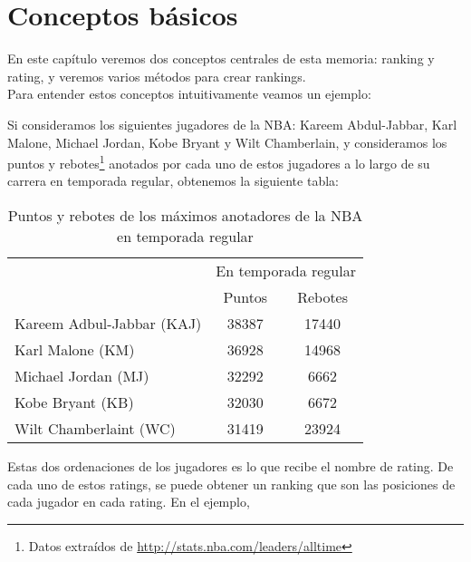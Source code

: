 \chapter{Conceptos básicos}


En este capítulo veremos dos conceptos centrales de esta memoria: ranking y rating, y veremos varios métodos para crear rankings.\\

Para entender estos conceptos intuitivamente veamos un ejemplo:

\begin{ejemplo}
Si consideramos los siguientes jugadores de la NBA: Kareem Abdul-Jabbar, Karl Malone, Michael Jordan, Kobe Bryant y Wilt Chamberlain, y consideramos los puntos y rebotes\footnote{Datos extraídos de \url{http://stats.nba.com/leaders/alltime}} anotados por cada uno de estos jugadores a lo largo de su carrera en temporada regular, obtenemos la siguiente tabla:

\begin{table}[h]
\centering
\caption[Puntos y rebotes de los máximos anotadores de la NBA]{Puntos y rebotes de los máximos anotadores de la NBA en temporada regular}
\label{tbl:puntos_rebotes}
\begin{tabular}{@{}lcc@{}}
\cmidrule(l){2-3}
\multicolumn{1}{c}{}      & \multicolumn{2}{c}{En temporada regular} \\ \cmidrule(l){2-3} 
\multicolumn{1}{c}{}      & Puntos             & Rebotes             \\ \midrule
Kareem Adbul-Jabbar (KAJ) & 38387              & 17440               \\ \midrule
Karl Malone (KM)          & 36928              & 14968               \\ \midrule
Michael Jordan (MJ)       & 32292              & 6662                \\ \midrule
Kobe Bryant (KB)          & 32030              & 6672                \\ \midrule
Wilt Chamberlaint (WC)    & 31419              & 23924               \\ \bottomrule
\end{tabular}
\end{table}

Estas dos ordenaciones de los jugadores es lo que recibe el nombre de rating. De cada uno de estos ratings, se puede obtener un ranking que son las posiciones de cada jugador en cada rating. En el ejemplo,


\end{ejemplo}
